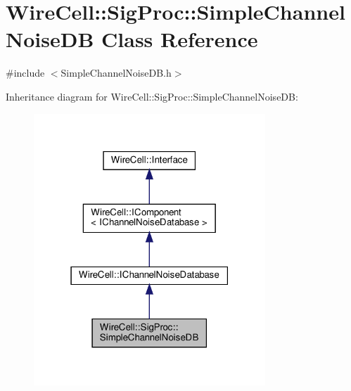 \hypertarget{class_wire_cell_1_1_sig_proc_1_1_simple_channel_noise_d_b}{}\section{Wire\+Cell\+:\+:Sig\+Proc\+:\+:Simple\+Channel\+Noise\+DB Class Reference}
\label{class_wire_cell_1_1_sig_proc_1_1_simple_channel_noise_d_b}


{\ttfamily \#include $<$Simple\+Channel\+Noise\+D\+B.\+h$>$}



Inheritance diagram for Wire\+Cell\+:\+:Sig\+Proc\+:\+:Simple\+Channel\+Noise\+DB\+:
\nopagebreak
\begin{figure}[H]
\begin{center}
\leavevmode
\includegraphics[width=247pt]{class_wire_cell_1_1_sig_proc_1_1_simple_channel_noise_d_b__inherit__graph}
\end{center}
\end{figure}


